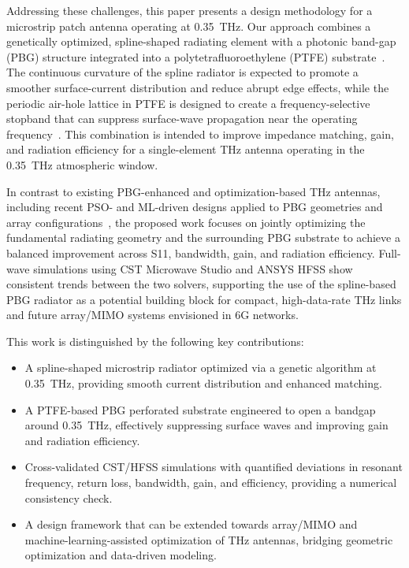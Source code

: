 \documentclass[USenglish]{article}
\begin{document}
Addressing these challenges, this paper presents a design methodology for a microstrip patch antenna operating at 0.35~THz. Our approach combines a genetically optimized, spline-shaped radiating element with a photonic band-gap (PBG) structure integrated into a polytetrafluoroethylene (PTFE) substrate~\cite{john_spline_monopole_2007,khezzar_pbg_2021}. The continuous curvature of the spline radiator is expected to promote a smoother surface-current distribution and reduce abrupt edge effects, while the periodic air-hole lattice in PTFE is designed to create a frequency-selective stopband that can suppress surface-wave propagation near the operating frequency~\cite{temmar_bspo_2019,kushwaha_photonic_2018}. This combination is intended to improve impedance matching, gain, and radiation efficiency for a single-element THz antenna operating in the 0.35~THz atmospheric window.

In contrast to existing PBG-enhanced and optimization-based THz antennas, including recent PSO- and ML-driven designs applied to PBG geometries and array configurations~\cite{babaahmed_hybrid_2025,li_triband_2024,panda_fractal_2025}, the proposed work focuses on jointly optimizing the fundamental radiating geometry and the surrounding PBG substrate to achieve a balanced improvement across S11, bandwidth, gain, and radiation efficiency. Full-wave simulations using CST Microwave Studio and ANSYS HFSS show consistent trends between the two solvers, supporting the use of the spline-based PBG radiator as a potential building block for compact, high-data-rate THz links and future array/MIMO systems envisioned in 6G networks.

This work is distinguished by the following key contributions:
\begin{itemize}
    \item A spline-shaped microstrip radiator optimized via a genetic algorithm at 0.35~THz, providing smooth current distribution and enhanced matching.
    \item A PTFE-based PBG perforated substrate engineered to open a bandgap around 0.35~THz, effectively suppressing surface waves and improving gain and radiation efficiency.
    \item Cross-validated CST/HFSS simulations with quantified deviations in resonant frequency, return loss, bandwidth, gain, and efficiency, providing a numerical consistency check.
    \item A design framework that can be extended towards array/MIMO and machine-learning-assisted optimization of THz antennas, bridging geometric optimization and data-driven modeling.
\end{itemize}
\end{document}
